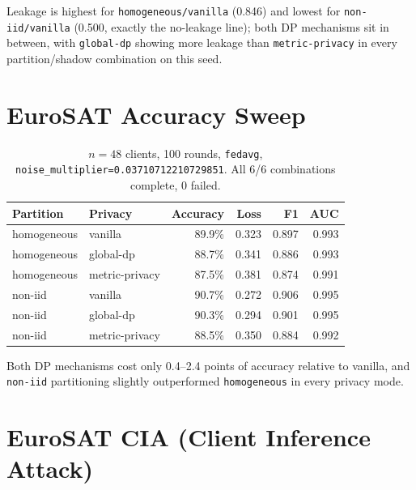 \documentclass[11pt]{article}
\newcommand{\code}[1]{\texttt{#1}}
\begin{document}
\noindent
Leakage is highest for \code{homogeneous/vanilla} (0.846) and lowest for
\code{non-iid/vanilla} (0.500, exactly the no-leakage line); both DP mechanisms sit in between,
with \code{global-dp} showing more leakage than \code{metric-privacy} in every partition/shadow
combination on this seed.

\section*{EuroSAT Accuracy Sweep}

\begin{table}[h!]
\centering
\begin{tabular}{llrrrr}
\toprule
Partition & Privacy & Accuracy & Loss & F1 & AUC \\
\midrule
homogeneous & vanilla & 89.9\% & 0.323 & 0.897 & 0.993 \\
homogeneous & global-dp & 88.7\% & 0.341 & 0.886 & 0.993 \\
homogeneous & metric-privacy & 87.5\% & 0.381 & 0.874 & 0.991 \\
non-iid & vanilla & 90.7\% & 0.272 & 0.906 & 0.995 \\
non-iid & global-dp & 90.3\% & 0.294 & 0.901 & 0.995 \\
non-iid & metric-privacy & 88.5\% & 0.350 & 0.884 & 0.992 \\
\bottomrule
\end{tabular}
\caption*{$n=48$ clients, 100 rounds, \code{fedavg}, \code{noise\_multiplier=0.03710712210729851}.
All 6/6 combinations complete, 0 failed.}
\end{table}

\noindent
Both DP mechanisms cost only 0.4--2.4 points of accuracy relative to vanilla, and \code{non-iid}
partitioning slightly outperformed \code{homogeneous} in every privacy mode.

\section*{EuroSAT CIA (Client Inference Attack)}
\end{document}
